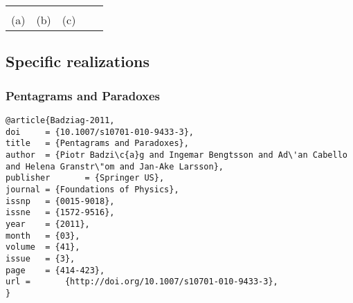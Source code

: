 \documentclass[%
  twocolumn,
 showpacs,
 showkeys,
 preprintnumbers,
 amsmath,amssymb,
 aps,
  pra,
  longbibliography,
 floatfix,
 ]{revtex4-1}
\begin{document}
\begin{figure*}
\begin{center}
\begin{tabular}{ccccc}
\begin{tikzpicture}  [scale=0.6]
\end{tikzpicture}
\\
(a)&(b)& (c)
\end{tabular}
\end{center}
\caption{\label{fig:d4}
(Color online)
Orthogonality diagram of the  the three  simplest (partially known~\cite{Hardy-93,cabello-96,Badziag-2011})
TIFS  in $d=4$, with 8(9) contexts and 9 atomic propositions.
It is realizable in  $S^3$ by taking,
for instance,
(a)
$v_1     = (  {0,-1,\sqrt{2},0}  )/\sqrt{3}$,
$v_2     = (  {1,0,0,0}    )$,
$v_3     = (  {1,\sqrt{2},1,0}   )/ 2 $,
$v_4     = (  {0,1,0,0}    ) $,
$v_5     = (  {1,0,-1,0}     )/\sqrt{2}$,
$v_6     = (  {0,0,1,0}     ) $,
$v_7   = (     {-1,\sqrt{2},-1,0} )/ 2$,
$v_8   =      (\sqrt{1-\varepsilon^2} / \sqrt{3})  ({\sqrt{2},1,0,0})+\varepsilon({0,0,0,1})$,
$v_9     = (   {0,0,0,1} )$,
(b)
$v_1     =   (\sqrt{1-\varepsilon^2} / \sqrt{3})(  {0,-1,\sqrt{2},0}  )+\varepsilon({0,0,0,1})$,
$v_8   =  (        {\sqrt{2},1,0,0} )/\sqrt{3}$,
(c)
$v_1     = (  {0,-1,\sqrt{2},0}  )/\sqrt{3}$,
$v_8   =  (        {\sqrt{2},1,0,0} ) /\sqrt{3}$.
Values on $v_1$ and $v_8$ cannot both be 1, as this would imply the values on $v_2=v_3=v_6=v_7=v_9$ to vanish,
which in turn would require both values $v_4$ as well as $v_5$ to be 1; which contradicts exclusivity
because those observables belong to the same context and are orthogonal.
In QT, the proposition $v_i$ is represented by the projector $| v_i \rangle\langle v_i |$.
}

\end{figure*}

\clearpage
\newpage

\widetext

\subsection{Specific realizations}

\subsubsection{Pentagrams and Paradoxes}
\begin{verbatim}
@article{Badziag-2011,
doi     = {10.1007/s10701-010-9433-3},
title   = {Pentagrams and Paradoxes},
author  = {Piotr Badzi\c{a}g and Ingemar Bengtsson and Ad\'an Cabello and Helena Granstr\"om and Jan-Ake Larsson},
publisher       = {Springer US},
journal = {Foundations of Physics},
issnp   = {0015-9018},
issne   = {1572-9516},
year    = {2011},
month   = {03},
volume  = {41},
issue   = {3},
page    = {414-423},
url =       {http://doi.org/10.1007/s10701-010-9433-3},
}
\end{verbatim}
\end{document}
